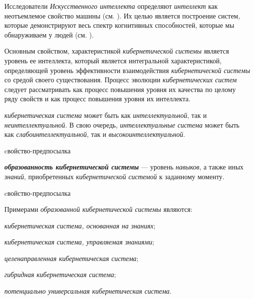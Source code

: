 Исследователи \textit{Искусственного интеллекта} определяют \textit{интеллект} как неотъемлемое свойство машины (см. ). 
Их целью является построение систем, которые демонстрируют весь спектр когнитивных способностей, которые мы обнаруживаем у людей (см. ).

Основным свойством, характеристикой \textit{кибернетической системы} является уровень ее интеллекта, который является интегральной характеристикой, определяющей уровень эффективности взаимодействия \textit{кибернетической системы} со средой своего существования. 
Процесс эволюции \textit{кибернетических систем} следует рассматривать как процесс повышения уровня их качества по целому ряду свойств и как процесс повышения уровня их интеллекта.

\textit{кибернетическая система} может быть как \textit{интеллектуальной}, так и \textit{неинтеллектуальной}. В свою очередь, \textit{интеллектуальные система} может быть как \textit{слабоинтеллектуальной}, так и \textit{высокоинтеллектуальной}.

\begin{SCn}
\begin{scnrelfromlist}{cвойство-предпосылка}
\end{scnrelfromlist}
\end{SCn}

\textbf{\textit{образованность кибернетической системы}} --- уровень \textit{навыков}, а также иных \textit{знаний}, приобретенных \textit{кибернетической системой} к заданному моменту. 

\begin{SCn}
\begin{scnrelfromlist}{cвойство-предпосылка}
\end{scnrelfromlist}
\end{SCn}

Примерами \textit{образованной кибернетической системы} являются:
\begin{textitemize}
    \item \textit{кибернетическая система, основанная на знаниях};
    \item \textit{кибернетическая система, управляемая знаниями};
    \item \textit{целенаправленная кибернетическая система};
    \item \textit{гибридная кибернетическая система};
    \item \textit{потенциально универсальная кибернетическая система}.
\end{textitemize}

